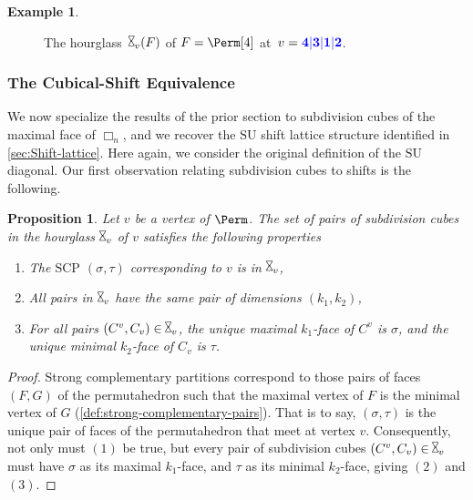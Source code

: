 \documentclass{amsart}
\newcommand{\red}{\color{red}} %
\newcommand{\blue}{\color{blue}} %
\newtheorem{proposition}[theorem]{Proposition}
\theoremstyle{definition}
\newtheorem{example}[theorem]{Example}
\newcommand{\SU}{\mathrm{SU}}
\newcommand{\SCP}{\mathrm{SCP}}
\newcommand{\divcube}[1]{\Box_{#1}}
\newcommand{\hour}{\raisebox{0.065cm}{\rotatebox[origin=c]{90}{$\bowtie$}}_v}
\begin{document}
\begin{example}
\begin{figure}
\begin{center}
{
	}
	\end{center}
	\caption{The hourglass~$\hour(F)$ of $F = \Perm[4]$ at~$v = \blue{\mathbf{4|3|1|2}}$.}
	\label{fig:hourglass1}
\end{figure}
%
\end{example}

\subsubsection{The Cubical-Shift Equivalence}

We now specialize the results of the prior section to subdivision cubes of the maximal face of $\divcube{n}$, and we recover the $\SU$ shift lattice structure identified in \cref{sec:Shift-lattice}.
Here again, we consider the original definition of the $\SU$ diagonal.
Our first observation relating subdivision cubes to shifts is the following. 

\begin{proposition}
\label{prop:ev properties}
Let $v$ be a vertex of $\Perm$.
The set of pairs of subdivision cubes in the hourglass $\hour$ of $v$ satisfies the following properties
\begin{enumerate}
	\item The $\SCP$ $(\sigma,\tau)$ corresponding to $v$ is in $\hour$,
	\item All pairs in $\hour$ have the same pair of dimensions $(k_1,k_2)$,
	\item For all pairs $(C^v,C_v) \in \hour$, the unique maximal $k_1$-face of $C^v$ is $\sigma$, and the unique minimal $k_2$-face of $C_v$ is $\tau$.
\end{enumerate}
\end{proposition}

\begin{proof}
Strong complementary partitions correspond to those pairs of faces $(F,G)$ of the permutahedron such that the maximal vertex of $F$ is the minimal vertex of $G$ (\cref{def:strong-complementary-pairs}).
That is to say, $(\sigma,\tau)$ is the unique pair of faces of the permutahedron that meet at vertex $v$.
Consequently, not only must $(1)$ be true, but every pair of subdivision cubes $(C^v,C_v) \in \hour$ must have $\sigma$ as its maximal $k_1$-face, and $\tau$ as its minimal $k_2$-face, giving $(2)$ and $(3)$.
\end{proof}
\end{document}

